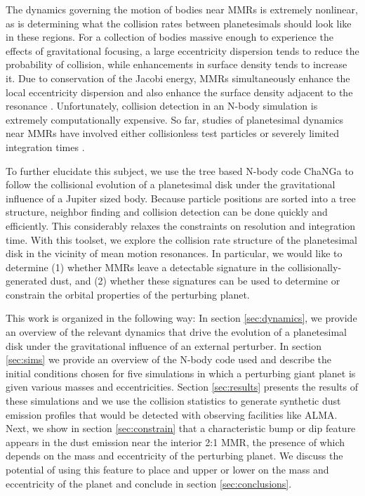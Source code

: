 \documentclass[twocolumn]{aastex63}
\begin{document}
The dynamics governing the motion of bodies near MMRs is extremely nonlinear, as is determining what the collision rates between planetesimals 
should look like in these regions. For a collection of bodies massive enough to experience the effects of gravitational focusing, a large eccentricity 
dispersion tends to reduce the probability of collision, while enhancements in surface density tends to increase it. Due to conservation of the Jacobi 
energy, MMRs simultaneously enhance the local eccentricity dispersion and also enhance the surface density adjacent to the resonance 
\citep{2000Icar..143...45R, 2017ApJ...850..103B}. Unfortunately, collision detection in an N-body simulation is extremely computationally expensive. 
So far, studies of planetesimal dynamics near MMRs have involved either collisionless test particles 
\citep{2017ApJ...850..103B, 2016ApJ...818..159T, 2018ApJ...857....3T} or severely limited integration times \citep{2000Icar..143...45R}.

To further elucidate this subject, we use the tree based N-body code {\sc ChaNGa}\citep{2008IEEEpds...ChaNGa, 2015AphCom..2..1} to follow the 
collisional evolution of a planetesimal disk under the gravitational influence of a Jupiter sized body. Because particle positions are sorted into a tree 
structure, neighbor finding and collision detection can be done quickly and efficiently. This considerably relaxes the constraints on resolution and 
integration time. With this toolset, we explore the collision rate structure of the planetesimal disk in the vicinity of mean motion resonances. In 
particular, we would like to determine (1) whether MMRs leave a detectable signature in the collisionally-generated dust, and (2) whether these 
signatures can be used to determine or constrain the orbital properties of the perturbing planet.

This work is organized in the following way: In section \ref{sec:dynamics}, we provide an overview of the relevant dynamics that drive the evolution 
of a planetesimal disk under the gravitational influence of an external perturber. In section \ref{sec:sims} we provide an overview of the N-body code 
used and describe the initial conditions chosen for five simulations in which a perturbing giant planet is given various masses 
and eccentricities. Section \ref{sec:results} presents the results of these simulations and we use the collision statistics to generate synthetic dust 
emission profiles that would be detected with observing facilities like ALMA. Next, we show in section \ref{sec:constrain} that a characteristic bump 
or dip feature appears in the dust emission near the interior 2:1 MMR, the presence of which depends on the mass and eccentricity of the perturbing 
planet. We discuss the potential of using this feature to place and upper or lower on the mass and eccentricity of the planet and conclude in section 
\ref{sec:conclusions}.
\end{document}
